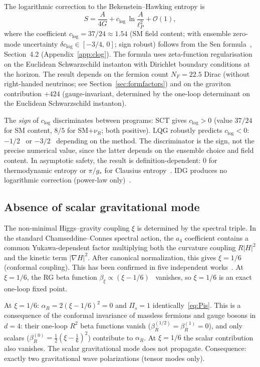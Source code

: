 \documentclass[12pt,a4paper]{article}
\theoremstyle{plain}
\theoremstyle{definition}
\theoremstyle{remark}
\newcommand{\order}{\mathcal{O}}
\begin{document}
The logarithmic correction to the Bekenstein--Hawking entropy is
\begin{equation}\label{eq:clog}
  S = \frac{A}{4G} + c_{\log}\, \ln\frac{A}{\ell_P^2}
  + \order(1),
\end{equation}
where the coefficient $c_{\log} = 37/24 \approx 1.54$ (SM field
content; with ensemble zero-mode uncertainty
$\delta c_{\log} \in [-3/4,\, 0]$; sign robust) follows from the
Sen formula~\cite{Sen:2012}, Section~4.2
(Appendix~\ref{app:clog}).  The formula uses zeta-function
regularisation on the Euclidean Schwarzschild instanton with
Dirichlet boundary conditions at the horizon.  The result
depends on the fermion count $N_F = 22.5$ Dirac (without
right-handed neutrinos; see Section~\ref{sec:formfactors}) and on
the graviton contribution $+424$ (gauge-invariant, determined by
the one-loop determinant on the Euclidean Schwarzschild
instanton).

The \emph{sign} of $c_{\log}$ discriminates between programs:
SCT gives $c_{\log} > 0$ (value $37/24$ for SM content, $8/5$
for SM$+\nu_R$; both positive).  LQG robustly predicts
$c_{\log} < 0$: $-1/2$~\cite{Meissner:2004} or
$-3/2$~\cite{KaulMajumdar:2000} depending on the method.  The
discriminator is the sign, not the precise numerical value,
since the latter depends on the ensemble choice and field
content.  In asymptotic safety, the result is
definition-dependent: $0$ for thermodynamic entropy or
$\pi/g_*$ for Clausius entropy~\cite{FallsLitim:2012}.  IDG
produces no logarithmic correction (power-law
only)~\cite{Myung:2017}.

\subsection{Absence of scalar gravitational mode}
\label{sec:scalar}

The non-minimal Higgs--gravity coupling $\xi$ is determined by
the spectral triple.  In the standard Chamseddine--Connes
spectral action, the $a_4$ coefficient contains a common
Yukawa-dependent factor multiplying both the curvature coupling
$R|H|^2$ and the kinetic term $|\nabla H|^2$.  After canonical
normalization, this gives $\xi = 1/6$ (conformal coupling).
This has been confirmed in five independent
works~\cite{CCM:2006,CC:2010,vS:2015,CCS:2013,DLM:2014}.
At $\xi = 1/6$, the RG beta function $\beta_\xi \propto
(\xi - 1/6)$~\cite{ParkerToms:2009} vanishes, so $\xi = 1/6$
is an exact one-loop fixed point.

At $\xi = 1/6$: $\alpha_R = 2(\xi - 1/6)^2 = 0$ and
$\Pi_s = 1$ identically~\eqref{eq:Pis}.  This is a consequence
of the conformal invariance of massless fermions and gauge bosons
in $d = 4$: their one-loop $R^2$ beta functions vanish
($\beta_R^{(1/2)} = \beta_R^{(1)} = 0$), and only scalars
($\beta_R^{(0)} = \frac{1}{2}(\xi - \frac{1}{6})^2$) contribute
to $\alpha_R$.  At $\xi = 1/6$ the scalar contribution also
vanishes.  The scalar gravitational mode does not propagate.
Consequence: exactly two gravitational wave polarizations
(tensor modes only).
\end{document}
